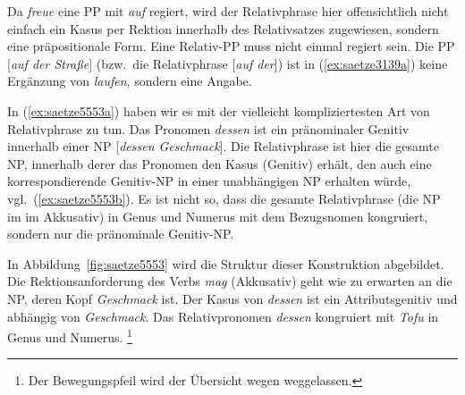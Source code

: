 \begin{exe}
  \ex\label{ex:saetze5552} 
    \begin{xlist}
    \end{xlist} 
\end{exe}

Da \textit{freue} eine PP mit \textit{auf} regiert, wird der Relativphrase hier offensichtlich nicht einfach ein Kasus per Rektion innerhalb des Relativsatzes zugewiesen, sondern eine präpositionale Form.
Eine Relativ-PP muss nicht einmal regiert sein.
Die PP [\textit{auf der Straße}] (bzw.\ die Relativphrase [\textit{auf der}]) ist  in (\ref{ex:saetze3139a}) keine Ergänzung von \textit{laufen}, sondern eine Angabe.

\begin{exe}
  \ex\label{ex:saetze3139}
  \begin{xlist}
  \end{xlist}
\end{exe}

In (\ref{ex:saetze5553a}) haben wir es mit der vielleicht kompliziertesten Art von Relativphrase zu tun.
Das Pronomen \textit{dessen} ist ein pränominaler Genitiv innerhalb einer NP [\textit{dessen Geschmack}].
Die Relativphrase ist hier die gesamte NP, innerhalb derer das Pronomen den Kasus (Genitiv) erhält, den auch eine korrespondierende Genitiv-NP in einer unabhängigen NP erhalten würde, vgl.\ (\ref{ex:saetze5553b}).
Es ist nicht so, dass die gesamte Relativphrase (die NP im im Akkusativ) in Genus und Numerus mit dem Bezugsnomen kongruiert, sondern nur die pränominale Genitiv-NP.

\begin{exe}
  \ex\label{ex:saetze5553} 
    \begin{xlist}
    \end{xlist}
\end{exe}


In Abbildung~\ref{fig:saetze5553} wird die Struktur dieser Konstruktion abgebildet.
Die Rektionsanforderung des Verbs \textit{mag} (Akkusativ) geht wie zu erwarten an die NP, deren Kopf \textit{Geschmack} ist.
Der Kasus von \textit{dessen} ist ein Attributsgenitiv und abhängig von \textit{Geschmack}.
Das Relativpronomen \textit{dessen} kongruiert mit \textit{Tofu} in Genus und Numerus.%
\footnote{Der Bewegungspfeil wird der Übersicht wegen weggelassen.}

